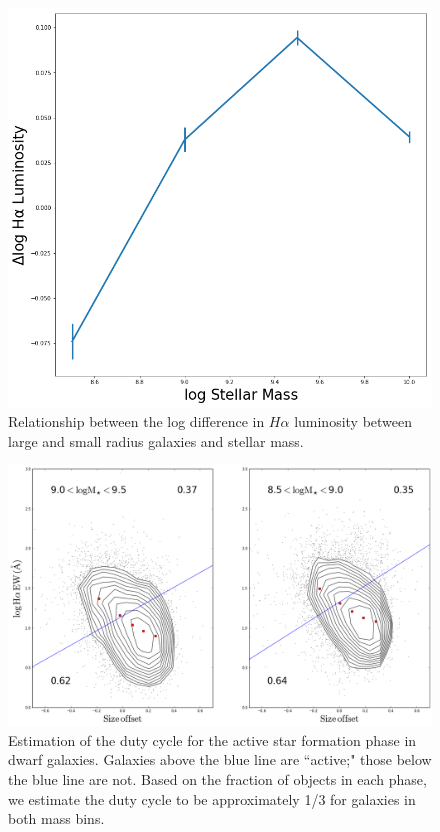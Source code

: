 \documentclass[iop]{emulateapj}
\begin{document}
\begin{figure}
	\centering
	\includegraphics[width= \columnwidth]{ratios_ha_lum.png}
	\caption{Relationship between the log difference in $H\alpha$ luminosity between large and small radius galaxies and stellar mass. }
	\label{fig:HA_lum_mass}
	
\end{figure}

\begin{figure}
	\centering
	\includegraphics[width=1.5 \columnwidth]{HA_duty.png}
	\caption{Estimation of the duty cycle for the active star formation phase in dwarf galaxies. Galaxies above the blue line are ``active;" those below the blue line are not. Based on the fraction of objects in each phase, we estimate the duty cycle to be approximately 1/3 for galaxies in both mass bins.}
     \label{fig:HA_duty}

\end{figure}
\end{document}
